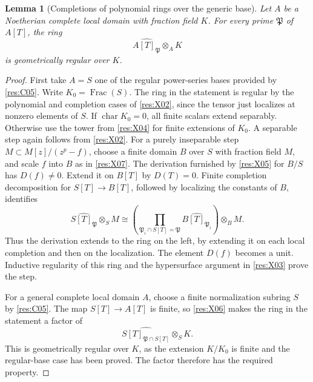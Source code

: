 \documentclass[11pt,oneside,openany]{book}
\newtheorem{lemma}[theorem]{Lemma}
\theoremstyle{definition}
\theoremstyle{remark}
\begin{document}
\begin{lemma}[Completions of polynomial rings over the generic base]\label{res:X12}
Let \(A\) be a Noetherian complete local domain with fraction field \(K\). For every prime \(\mathfrak P\) of \(A[T]\), the ring
\[
                 \widehat{A[T]_{\mathfrak P}}\otimes_A K
\]
is geometrically regular over \(K\).
\end{lemma}
\begin{proof}
First take \(A=S\) one of the regular power-series bases provided by \ref{res:C05}. Write \(K_0=\operatorname{Frac}(S)\). The ring in the statement is regular by the polynomial and completion cases of \ref{res:X02}, since the tensor just localizes at nonzero elements of \(S\). If \(\operatorname{char}K_0=0\), all finite scalars extend separably. Otherwise use the tower from \ref{res:X04} for finite extensions of \(K_0\). A separable step again follows from \ref{res:X02}. For a purely inseparable step \(M\subset M[z]/(z^p-f)\), choose a finite domain \(B\) over \(S\) with fraction field \(M\), and scale \(f\) into \(B\) as in \ref{res:X07}. The derivation furnished by \ref{res:X05} for \(B/S\) has \(D(f)\ne0\). Extend it on \(B[T]\) by \(D(T)=0\). Finite completion decomposition for \(S[T]\to B[T]\), followed by localizing the constants of \(B\), identifies
\[
 \widehat{S[T]_{\mathfrak P}}\otimes_S M
   \cong
 \left(\prod_{\mathfrak P_i\cap S[T]=\mathfrak P}
                \widehat{B[T]_{\mathfrak P_i}}\right)\otimes_B M .
\]
Thus the derivation extends to the ring on the left, by extending it on each local completion and then on the localization. The element \(D(f)\) becomes a unit. Inductive regularity of this ring and the hypersurface argument in \ref{res:X03} prove the step.

For a general complete local domain \(A\), choose a finite normalization subring \(S\) by \ref{res:C05}. The map \(S[T]\to A[T]\) is finite, so \ref{res:X06} makes the ring in the statement a factor of
\[
         \widehat{S[T]_{\mathfrak P\cap S[T]}}\otimes_S K .
\]
This is geometrically regular over \(K\), as the extension \(K/K_0\) is finite and the regular-base case has been proved. The factor therefore has the required property.
\end{proof}
\end{document}
